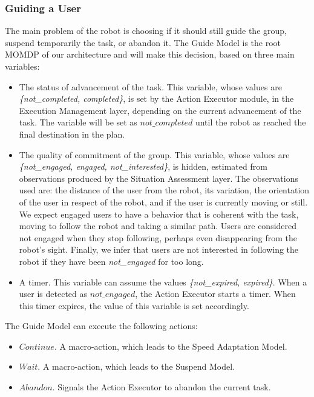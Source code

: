 \subsubsection{Guiding a User}
The main problem of the robot is choosing if it should still guide the group, suspend temporarily the task, or abandon it. The Guide Model is the root MOMDP of our architecture and will make this decision, based on three main variables: 
\begin{itemize}
\item The status of advancement of the task. This variable, whose values are \textit{\{not\_completed, completed\}}, is set by the Action Executor module, in the Execution Management layer, depending on the current advancement of the task. The variable will be set as $not\_completed$ until the robot as reached the final destination in the plan. 
\item The quality of commitment of the group. This variable, whose values are \textit{\{not\_engaged, engaged, not\_interested\}}, is hidden, estimated from observations produced by the Situation Assessment layer. The observations used are: the distance of the user from the robot, its variation, the orientation of the user in respect of the  robot, and if the user is currently moving or still. We expect engaged users to have a behavior that is coherent with the task, moving to follow the robot and taking a similar path. Users are considered not engaged when they stop following, perhaps even disappearing from the robot's sight. Finally, we infer that users are not interested in following the robot if they have been \textit{not\_engaged}  for too long.
\item A timer. This variable can assume the values \textit{\{not\_expired, expired\}}. When a user is detected as $not\_engaged$, the Action Executor starts a timer. When this timer expires, the value of this variable is set accordingly.
\end{itemize}

The Guide Model can execute the following actions:
\begin{itemize}
\item $Continue$. A macro-action, which leads to the Speed Adaptation Model.
\item $Wait$. A macro-action, which leads to the Suspend Model.
\item $Abandon$. Signals the Action Executor to abandon the current task.
\end{itemize}

